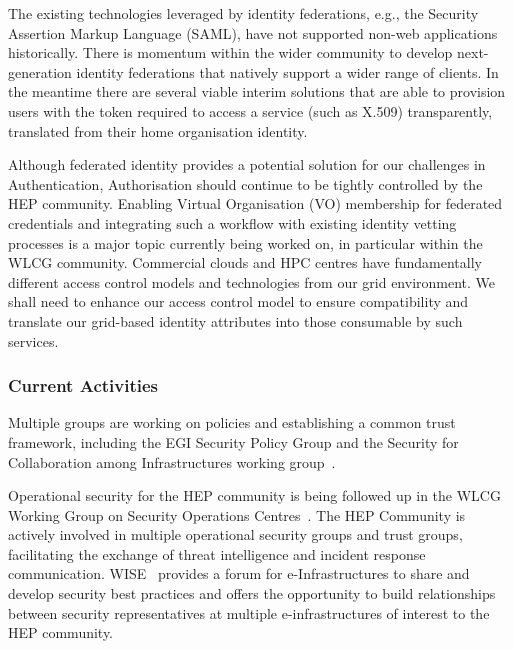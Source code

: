 \documentclass[12pt,a4paper]{article}
\begin{document}
The existing technologies leveraged by identity federations, e.g., the
Security Assertion Markup Language (SAML), have not supported non-web
applications historically. There is momentum within the wider community
to develop next-generation identity federations that natively support a
wider range of clients. In the meantime there are several viable interim
solutions that are able to provision users with the token required to
access a service (such as X.509) transparently, translated from their
home organisation identity.

Although federated identity provides a potential solution for our
challenges in Authentication, Authorisation should continue to be
tightly controlled by the HEP community. Enabling Virtual Organisation
(VO) membership for federated credentials and integrating such a
workflow with existing identity vetting processes is a major topic
currently being worked on, in particular within the WLCG community.
Commercial clouds and HPC centres have fundamentally different access
control models and technologies from our grid environment. We shall need
to enhance our access control model to ensure compatibility and
translate our grid-based identity attributes into those consumable by
such services.

\subsubsection*{Current Activities}

Multiple groups are working on policies and establishing a common trust
framework, including the EGI Security Policy Group
\cite{EGISecurityPolicyGroup} and the Security for Collaboration among
Infrastructures working group~\cite{SCI_WG}.

Operational security for the HEP community is being followed up in the
WLCG Working Group on Security Operations Centres~\cite{WLCG-SOC-WG}. The
HEP Community is actively involved in multiple operational security
groups and trust groups, facilitating the exchange of threat
intelligence and incident response communication. WISE~\cite{WISE}
provides a forum for e-Infrastructures to share and develop security
best practices and offers the opportunity to build relationships between
security representatives at multiple e-infrastructures of interest to
the HEP community.
\end{document}
